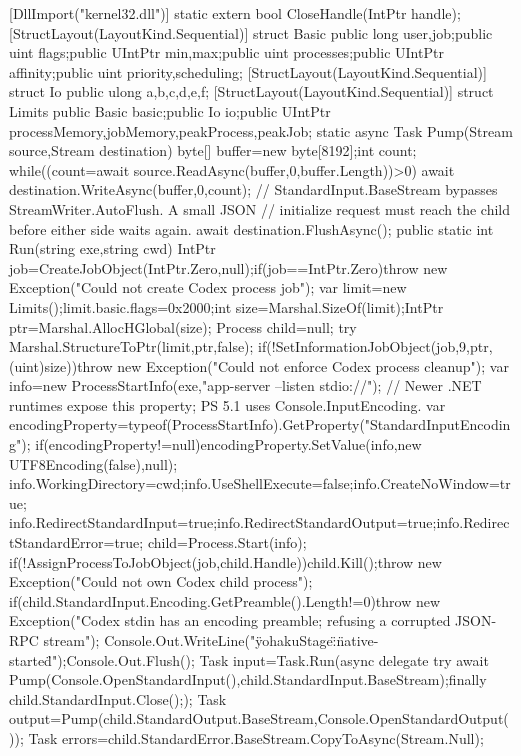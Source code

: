 {{ [DllImport("kernel32.dll")] static extern bool CloseHandle(IntPtr handle);
 [StructLayout(LayoutKind.Sequential)] struct Basic {
  public long user,job;public uint flags;public UIntPtr min,max;public uint processes;public UIntPtr affinity;public uint priority,scheduling;
 }
 [StructLayout(LayoutKind.Sequential)] struct Io {public ulong a,b,c,d,e,f;}
 [StructLayout(LayoutKind.Sequential)] struct Limits {public Basic basic;public Io io;public UIntPtr processMemory,jobMemory,peakProcess,peakJob;}
 static async Task Pump(Stream source,Stream destination) {
  byte[] buffer=new byte[8192];int count;
  while((count=await source.ReadAsync(buffer,0,buffer.Length))>0) {
   await destination.WriteAsync(buffer,0,count);
   // StandardInput.BaseStream bypasses StreamWriter.AutoFlush. A small JSON
   // initialize request must reach the child before either side waits again.
   await destination.FlushAsync();
  }
 }
 public static int Run(string exe,string cwd) {
  IntPtr job=CreateJobObject(IntPtr.Zero,null);if(job==IntPtr.Zero)throw new Exception("Could not create Codex process job");
  var limit=new Limits();limit.basic.flags=0x2000;int size=Marshal.SizeOf(limit);IntPtr ptr=Marshal.AllocHGlobal(size);
  Process child=null;
  try {
   Marshal.StructureToPtr(limit,ptr,false);
   if(!SetInformationJobObject(job,9,ptr,(uint)size))throw new Exception("Could not enforce Codex process cleanup");
   var info=new ProcessStartInfo(exe,"app-server --listen stdio://");
   // Newer .NET runtimes expose this property; PS 5.1 uses Console.InputEncoding.
   var encodingProperty=typeof(ProcessStartInfo).GetProperty("StandardInputEncoding");
   if(encodingProperty!=null)encodingProperty.SetValue(info,new UTF8Encoding(false),null);
   info.WorkingDirectory=cwd;info.UseShellExecute=false;info.CreateNoWindow=true;
   info.RedirectStandardInput=true;info.RedirectStandardOutput=true;info.RedirectStandardError=true;
   child=Process.Start(info);
   if(!AssignProcessToJobObject(job,child.Handle)){child.Kill();throw new Exception("Could not own Codex child process");}
   if(child.StandardInput.Encoding.GetPreamble().Length!=0)throw new Exception("Codex stdin has an encoding preamble; refusing a corrupted JSON-RPC stream");
   Console.Out.WriteLine("{\"yohakuStage\":\"native-started\"}");Console.Out.Flush();
   Task input=Task.Run(async delegate {try {await Pump(Console.OpenStandardInput(),child.StandardInput.BaseStream);}finally {child.StandardInput.Close();}});
   Task output=Pump(child.StandardOutput.BaseStream,Console.OpenStandardOutput());
   Task errors=child.StandardError.BaseStream.CopyToAsync(Stream.Null);
}}}}
